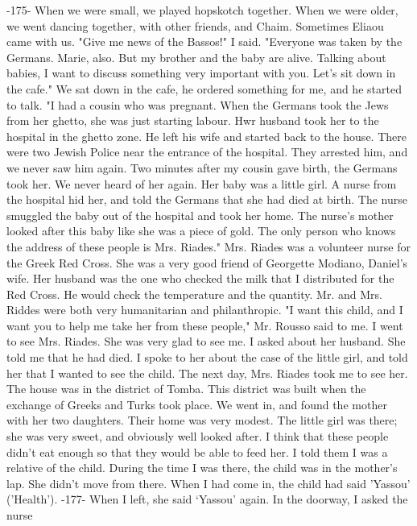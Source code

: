 
-175- 
When we were small, we played hopskotch together. When we were older, 
we went dancing together, with other friends, and Chaim. Sometimes 
Eliaou came with us. 
"Give me news of the Bassos!" I said. 
"Everyone was taken by the Germans. Marie, also. But my brother 
and the baby are alive. Talking about babies, I want to discuss something very important with you. Let's sit down in the cafe." 
We sat down in the cafe, he ordered something for me, and he started to 
talk. "I had a cousin who was pregnant. When the Germans took the 
Jews from her ghetto, she was just starting labour. Hwr husband took 
her to the hospital in the ghetto zone. He left his wife and started 
back to the house. There were two Jewish Police near the entrance of 
the hospital. They arrested him, and we never saw him again. Two minutes after my cousin gave birth, the Germans took her. We never heard 
of her again. Her baby was a little girl. A nurse from the hospital 
hid her, and told the Germans that she had died at birth. The nurse 
smuggled the baby out of the hospital and took her home. The nurse's 
mother looked after this baby like she was a piece of gold. The only 
person who knows the address of these people is Mrs. Riades." 
Mrs. Riades was a volunteer nurse for the Greek Red Cross. She was 
a very good friend of Georgette Modiano, Daniel's wife. Her husband was 
the one who checked the milk that I distributed for the Red Cross. He 
would check the temperature and the quantity. Mr. and Mrs. Riddes were 
both very humanitarian and philanthropic. 
"I want this child, and I want you to help me take her from these 
people," Mr. Rousso said to me. 
I went to see Mrs. Riades. She was very glad to see me. I asked 
about her husband. She told me that he had died. I spoke to her about 
the case of the little girl, and told her that I wanted to see the 
child. The next day, Mrs. Riades took me to see her. 
The house was in the district of Tomba. This district was built 
when the exchange of Greeks and Turks took place. We went in, and found 
the mother with her two daughters. Their home was very modest. The 
little girl was there; she was very sweet, and obviously well looked after. I think that these people didn't eat enough so that they would be 
able to feed her. I told them I was a relative of the child. During the time I was there, the child was in the mother's lap. She didn't move
from there. When I had come in, the child had said 'Yassou' ('Health'). 
-177- 
When I left, she said ‘Yassou’ again. In the doorway, I asked the nurse 
